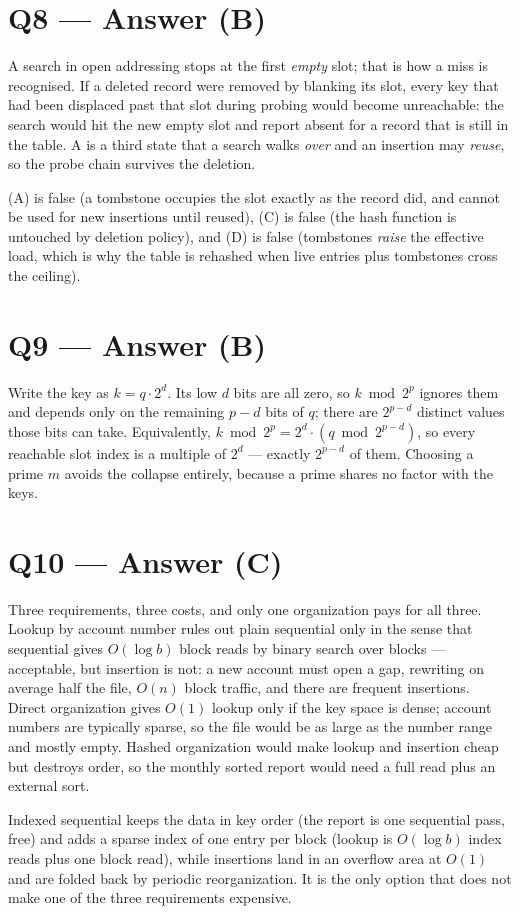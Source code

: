 \documentclass[11pt]{article}
\begin{document}
\section*{Q8 --- Answer (B)}

A search in open addressing stops at the first \emph{empty} slot; that is how a miss is recognised. If a deleted record were removed by blanking its slot, every key that had been displaced past that slot during probing would become unreachable: the search would hit the new empty slot and report absent for a record that is still in the table. A  is a third state that a search walks \emph{over} and an insertion may \emph{reuse}, so the probe chain survives the deletion.

(A) is false (a tombstone occupies the slot exactly as the record did, and cannot be used for new insertions until reused), (C) is false (the hash function is untouched by deletion policy), and (D) is false (tombstones \emph{raise} the effective load, which is why the table is rehashed when live entries plus tombstones cross the ceiling).

\section*{Q9 --- Answer (B)}

Write the key as $k = q\cdot 2^d$. Its low $d$ bits are all zero, so $k \bmod 2^p$ ignores them and depends only on the remaining $p-d$ bits of $q$; there are $2^{p-d}$ distinct values those bits can take. Equivalently, $k \bmod 2^p = 2^d \cdot (q \bmod 2^{p-d})$, so every reachable slot index is a multiple of $2^d$ --- exactly $2^{p-d}$ of them. Choosing a prime $m$ avoids the collapse entirely, because a prime shares no factor with the keys.

\section*{Q10 --- Answer (C)}

Three requirements, three costs, and only one organization pays for all three. Lookup by account number rules out plain sequential only in the sense that sequential gives $O(\log b)$ block reads by binary search over blocks --- acceptable, but insertion is not: a new account must open a gap, rewriting on average half the file, $O(n)$ block traffic, and there are frequent insertions. Direct organization gives $O(1)$ lookup only if the key space is dense; account numbers are typically sparse, so the file would be as large as the number range and mostly empty. Hashed organization would make lookup and insertion cheap but destroys order, so the monthly sorted report would need a full read plus an external sort.

Indexed sequential keeps the data in key order (the report is one sequential pass, free) and adds a sparse index of one entry per block (lookup is $O(\log b)$ index reads plus one block read), while insertions land in an overflow area at $O(1)$ and are folded back by periodic reorganization. It is the only option that does not make one of the three requirements expensive.



\end{document}

